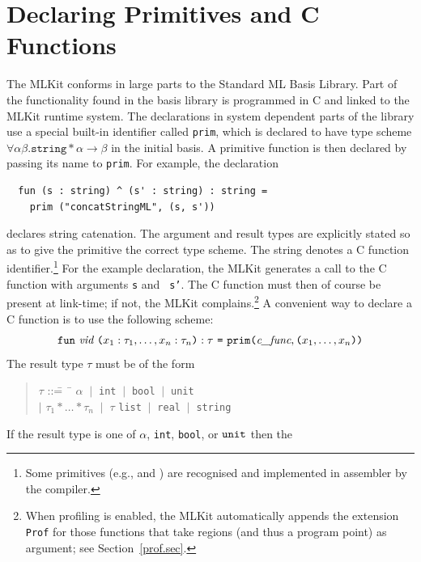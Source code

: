 \documentclass[12pt]{book}
\begin{document}
\section{Declaring Primitives and C Functions}
\label{parPassing.sec}
The MLKit conforms in large parts to the Standard ML Basis Library. Part
of the functionality found in the basis library is programmed in C and
linked to the MLKit runtime system.  The declarations in system
dependent parts of the library use a special built-in identifier
called \texttt{prim}, which is declared to have type
scheme $\forall \alpha \beta .  \texttt{string}
\ast \alpha \rightarrow \beta$ in the initial basis.  A primitive
function is then declared by passing its name to \texttt{prim}.  For
example, the declaration
\begin{verbatim}
  fun (s : string) ^ (s' : string) : string =
    prim ("concatStringML", (s, s'))
\end{verbatim}
declares string catenation.  The argument and result types are
explicitly stated so as to give the primitive the correct type scheme.
The string  denotes a C function
identifier.\footnote{Some primitives (e.g.,  and
  ) are recognised and implemented in assembler by the
  compiler.} For the example declaration, the MLKit generates a call to
the C function  with arguments {\tt s} and {\tt
  s'}. The C function must then of course be present at link-time; if
not, the MLKit complains.\footnote{When profiling is enabled, the MLKit
  automatically appends the extension \texttt{Prof} for those
  functions that take regions (and thus a program point) as argument;
  see Section~\ref{prof.sec}.}%
A convenient way to declare a C function is to use the following
scheme:
$$\texttt{fun}~ \emph{vid} ~\texttt{(}x_1:\tau_1, \ldots, x_n:\tau_n\texttt{)}
    : \tau ~\texttt{=} ~\texttt{prim(}\emph{c\_func}, \texttt{(}
  x_1, \ldots, x_n\texttt{)} \texttt{)}
$$
The result type $\tau$ must be of the form
\begin{quote}
\begin{tabbing}
$\tau$ ::\== ~\= $\alpha$ $~|~$ {\tt int} $~|~$ {\tt bool} $~|~$ {\tt unit} \\
  \> $|$ \> $\tau_1 \ast \ldots \ast \tau_n$ $~|~$ $\tau$ {\tt list} $~|~$ {\tt real} $~|~$ {\tt string}
\end{tabbing}
\end{quote}
\noindent
If the result type is one of $\alpha$, {\tt int}, {\tt bool}, or ${\tt unit}$ then the
\end{document}
